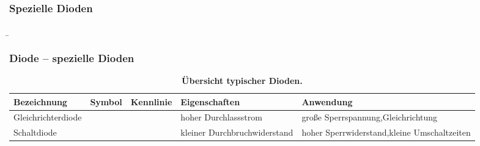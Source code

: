 \subsubsection{Spezielle Dioden}
\begin{frame}
    \b{
        \frametitle{Diode -- spezielle Dioden}
        \begin{table}[H]
            \centering
            \begin{tabular}{ |p{2.1cm}|p{1.4cm}|p{3.2cm}|p{2.8cm}|p{3cm}| }
                \hline
                \textbf{Bezeichnung}         & \textbf{Symbol} & \textbf{Kennlinie} & \textbf{Eigenschaften} & \textbf{Anwendung} \\
                \hline
                Gleich\-richter\-diode
                                             &
                \begin{minipage}[t][2.6cm][c]{1.4cm}
                    \centering 
                \end{minipage}
                                             &
                \begin{minipage}[t][2.6cm][c]{3.3cm}
                    \centering 
                \end{minipage}
                                             &
                hoher Durchlassstrom         &
                große Sperrspannung,\newline Gleichrichtung                                                                       \\
                \hline
                Schalt\-diode
                                             &
                \begin{minipage}[t][2.6cm][c]{1.4cm}
                    \centering 
                \end{minipage}
                                             &
                \begin{minipage}[t][2.6cm][c]{3.3cm}
                    \centering 
                \end{minipage}
                                             &
                kleiner Durchbruchwiderstand &
                hoher Sperrwiderstand,\newline kleine Umschaltzeiten                                                              \\
                \hline
            \end{tabular}
            \caption{\textbf{Übersicht typischer Dioden.}}
        \end{table}
    }
\end{frame}

